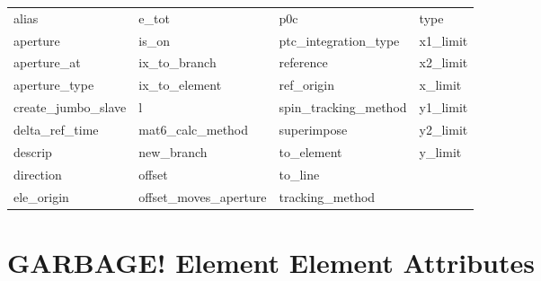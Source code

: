  \begin{tabular}{llll} \toprule
alias                       & e_tot                       & p0c                         & type                        \\
aperture                    & is_on                       & ptc_integration_type        & x1_limit                    \\
aperture_at                 & ix_to_branch                & reference                   & x2_limit                    \\
aperture_type               & ix_to_element               & ref_origin                  & x_limit                     \\
create_jumbo_slave          & l                           & spin_tracking_method        & y1_limit                    \\
delta_ref_time              & mat6_calc_method            & superimpose                 & y2_limit                    \\
descrip                     & new_branch                  & to_element                  & y_limit                     \\
direction                   & offset                      & to_line                     &                             \\
ele_origin                  & offset_moves_aperture       & tracking_method             &                             \\
 \bottomrule
 \end{tabular}
 \vfill
 
 \section{GARBAGE! Element Element Attributes}
 \label{s:list.garbage!}
 
